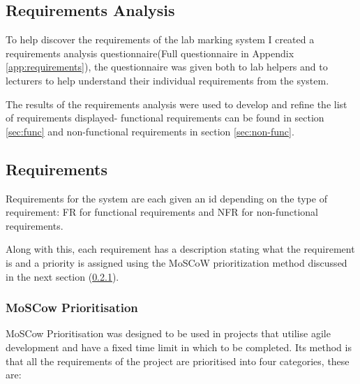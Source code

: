 \documentclass[12pt]{article}  %
\begin{document}
\subsection{Requirements Analysis}
To help discover the requirements of the lab marking system I created a requirements analysis questionnaire(Full questionnaire in Appendix \ref{app:requirements}), the questionnaire was given both to lab helpers and to lecturers to help understand their individual requirements from the system. 

The results of the requirements analysis were used to develop and refine the  list of requirements displayed- functional requirements can be found in section \ref{sec:func} and non-functional requirements in section \ref{sec:non-func}.



\subsection{Requirements}
\label{sec:requirements}
Requirements for the system are each given an id depending on the type of requirement: FR for functional requirements and NFR for non-functional requirements.

Along with this, each requirement has a description stating what the requirement is and a priority is assigned using the MoSCoW prioritization method discussed in the next section (\ref{sec:moscow}).


\subsubsection{MoSCow Prioritisation}
\label{sec:moscow}

MoSCow Prioritisation \cite{noauthor_moscow_2015} was designed to be used in projects that utilise agile development and have a fixed time limit in which to be completed. Its method is that all the requirements of the project are prioritised into four categories, these are:
\end{document}
